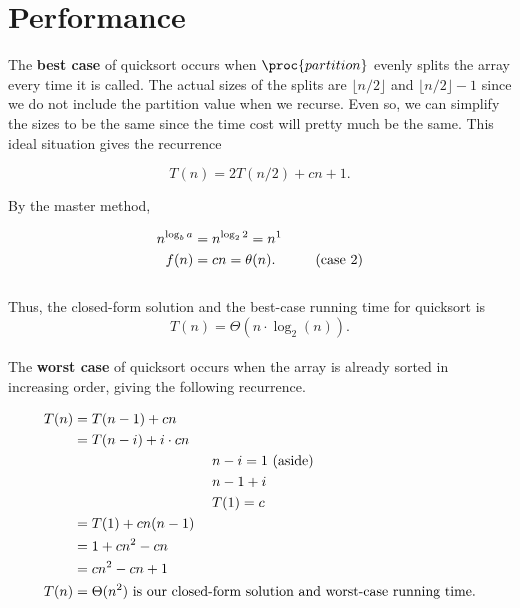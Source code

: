 \documentclass{article}
\begin{document}
\newpage

\section*{Performance}
The \textbf{best case} of quicksort occurs when $\proc{partition}$ evenly splits the array every time it is called. The actual sizes of the splits are $\lfloor n/2 \rfloor$ and $\lfloor n/2 \rfloor - 1$ since we do not include the partition value when we recurse. Even so, we can simplify the sizes to be the same since the time cost will pretty much be the same. This ideal situation gives the recurrence

\begin{equation*}
    T(n) = 2T(n/2) + cn + 1.
\end{equation*}

By the master method,

\begin{equation*}
\begin{split}
    n^{\log_b{a}} & = n^{\log_2{2}} = n^1 \\
    f(n) & = cn = \theta{(n)}. \text{\hspace{10mm}(case 2)}
\end{split}
\end{equation*}
\\
Thus, the closed-form solution and the best-case running time for quicksort is
\begin{equation*}
    T(n) = \Theta{(n \cdot \log_2{(n)})}.
\end{equation*}
\\
The \textbf{worst case} of quicksort occurs when the array is already sorted in increasing order, giving the following recurrence.

\begin{equation*}
\begin{split}
    T(n) &= T(n-1) + cn \\
        &= T(n-i) + i \cdot cn\\
    & \hspace{35mm} n - i = 1 \text{ (aside)}\\
    & \hspace{35mm} n - 1 + i \\
    & \hspace{35mm} T(1) = c \\
        &= T(1) + cn(n-1)\\
        &= 1 + cn^{2} - cn\\
        &= cn^{2} - cn + 1\\
    T(n) &= \Theta{(n^2)} \text{ is our closed-form solution and worst-case running time.}
\end{split}
\end{equation*}
\end{document}
